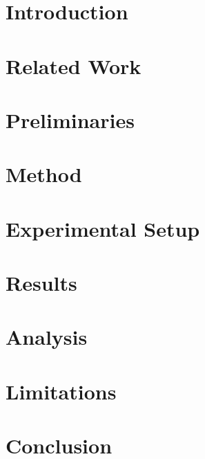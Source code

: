 \documentclass{article}
\theoremstyle{plain}
\theoremstyle{definition}
\theoremstyle{remark}
\begin{document}
\printAffiliationsAndNotice{\icmlEqualContribution} %

\begin{abstract}

\end{abstract}

\section{Introduction}
\label{sec:introduction}


\section{Related Work}
\label{sec:relatedwork}


\section{Preliminaries}
\label{sec:background}


\section{Method}
\label{sec:method}


\section{Experimental Setup}
\label{sec:experiment}


\section{Results}
\label{sec:results}


\section{Analysis}
\label{sec:analysis}


\section{Limitations}
\label{sec:limitations}


\section{Conclusion}
\label{sec:conclusion}

\end{document}
